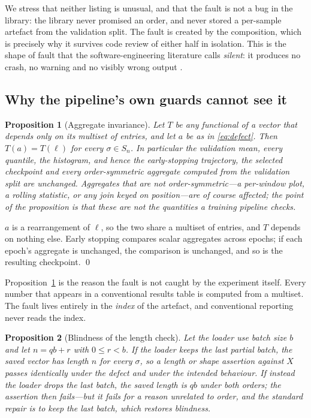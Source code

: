 \documentclass[a4paper,fleqn]{cas-sc}
\newtheorem{proposition}{Proposition}
\begin{document}
We stress that neither listing is unusual, and that the fault is not a bug in the
library: the library never promised an order, and never stored a per-sample
artefact from the validation split. The fault is created by the composition, which
is precisely why it survives code review of either half in isolation. This is the
shape of fault that the software-engineering literature calls \emph{silent}: it
produces no crash, no warning and no visibly wrong output
\citep{tambon2024,islam2019,zhang2018tf}.

\subsection{Why the pipeline's own guards cannot see it}
\label{sec:silence}

\begin{proposition}[Aggregate invariance]
\label{prop:invariance}
Let $T$ be any functional of a vector that depends only on its multiset of
entries, and let $a$ be as in \eqref{eq:defect}. Then $T(a) = T(\ell)$ for every
$\sigma \in S_n$. In particular the validation mean, every quantile, the
histogram, and hence the early-stopping trajectory, the selected checkpoint and
every order-symmetric aggregate computed from the validation split are unchanged.
Aggregates that are not order-symmetric---a per-window plot, a rolling statistic,
or any join keyed on position---are of course affected; the point of the
proposition is that these are not the quantities a training pipeline checks.
\end{proposition}

\begin{pf}
$a$ is a rearrangement of $\ell$, so the two share a multiset of entries, and $T$
depends on nothing else. Early stopping compares scalar aggregates across epochs;
if each epoch's aggregate is unchanged, the comparison is unchanged, and so is the
resulting checkpoint. \qed
\end{pf}

Proposition~\ref{prop:invariance} is the reason the fault is not caught by the
experiment itself. Every number that appears in a conventional results table is
computed from a multiset. The fault lives entirely in the \emph{index} of the
artefact, and conventional reporting never reads the index.

\begin{proposition}[Blindness of the length check]
\label{prop:length}
Let the loader use batch size $b$ and let $n = qb + r$ with $0 \le r < b$. If the
loader keeps the last partial batch, the saved vector has length $n$ for every
$\sigma$, so a length or shape assertion against $X$ passes identically under the
defect and under the intended behaviour. If instead the loader drops the last
batch, the saved length is $qb$ under both orders; the assertion then fails---but
it fails for a reason unrelated to order, and the standard repair is to keep the
last batch, which restores blindness.
\end{proposition}
\end{document}
